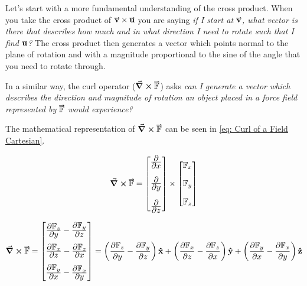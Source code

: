 \documentclass[main.tex]{subfiles}
\begin{document}
                    Let's start with a more fundamental understanding of the cross product. When you take the cross product of $\vect{v} \times \vect{u}$ you are saying \textit{if I start at $\vect{v}$, what vector is there that describes how much and in what direction I need to rotate such that I find $\vect{u}$?}
                    The cross product then generates a vector which points normal to the plane of rotation and with a magnitude proportional to the sine of the angle that you need to rotate through.

                    In a similar way, the curl operator ($\curl{\vect{\mathbb{F}}}$) asks \textit{can I generate a vector which describes the direction and magnitude of rotation an object placed in a force field represented by $\vect{\mathbb{F}}$ would experience?}

                    The mathematical representation of $\curl{\vect{\mathbb{F}}}$ can be seen in \eqref{eq: Curl of a Field Cartesian}.


                    \begin{equation}
                        \curl{\vect{\mathbb{F}}} = \Matrix{\bfrac{\partial}{\partial x} \vspace{1em}\\\bfrac{\partial}{\partial y} \vspace{1em}\\\bfrac{\partial}{\partial z}} \times \Matrix{\mathbb{F}_x\\[1em] \mathbb{F}_y\\[1em] \mathbb{F}_z}
                        \label{eq: Curl working}
                    \end{equation}

                    \begin{equation}
                        \curl{\vect{\mathbb{F}}} = \Matrix{\bfrac{\partial \mathbb{F}_z}{\partial y} - \bfrac{\partial \mathbb{F}_y}{\partial z}\\[1em] \bfrac{\partial \mathbb{F}_x}{\partial z} - \bfrac{\partial \mathbb{F}_z}{\partial x}\\[1em] \bfrac{\partial \mathbb{F}_y}{\partial x} - \bfrac{\partial \mathbb{F}_x}{\partial y}} = \left(\bfrac{\partial \mathbb{F}_z}{\partial y} - \bfrac{\partial \mathbb{F}_y}{\partial z}\right)\vhat{x} + \left(\bfrac{\partial \mathbb{F}_x}{\partial z} - \bfrac{\partial \mathbb{F}_z}{\partial x}\right)\vhat{y} + \left(\bfrac{\partial \mathbb{F}_y}{\partial x} - \bfrac{\partial \mathbb{F}_x}{\partial y}\right)\vhat{z}
                        \label{eq: Curl of a Field Cartesian}
                    \end{equation}
\end{document}
